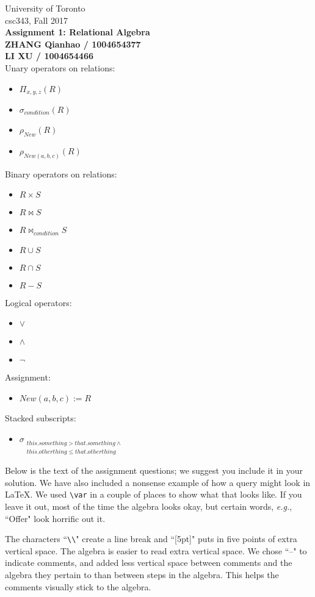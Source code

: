 \documentclass{article}
\newcommand{\var}[1]{\mathit{#1}}
\begin{document}
\noindent
University of Toronto\\
{\sc csc}343, Fall 2017\\[10pt]
{\LARGE\bf Assignment 1: Relational Algebra \\
ZHANG Qianhao / 1004654377 \\
LI XU / 1004654466
} \\[10pt]

\noindent
Unary operators on relations:
\begin{itemize}
\item $\Pi_{x, y, z} (R)$
\item $\sigma_{condition} (R) $
\item $\rho_{New} (R) $
\item $\rho_{New(a, b, c)} (R) $
\end{itemize}
Binary operators on relations:
\begin{itemize}
\item $R \times S$
\item $R \bowtie S$
\item $R \bowtie_{condition} S$
\item $R \cup S$
\item $R \cap S$
\item $R - S$
\end{itemize}
Logical operators:
\begin{itemize}
\item $\vee$
\item $\wedge$
\item $\neg$
\end{itemize}
Assignment:
\begin{itemize}
\item $New(a, b, c) := R$
\end{itemize}
Stacked subscripts:
\begin{itemize}
\item
$\sigma_{\substack{this.something > that.something \wedge \\ this.otherthing \leq that.otherthing}}$
\end{itemize}

\noindent
Below is the text of the assignment questions; we suggest you include it in your solution.
We have also included a nonsense example of how a query might look in LaTeX.  
We used \verb|\var| in a couple of places to show what that looks like.  
If you leave it out, most of the time the algebra looks okay, but certain words,
{\it e.g.}, ``Offer" look horrific out it.

The characters ``\verb|\\|" create a line break and ``[5pt]" puts in 
five points of extra vertical space.  The algebra is easier to read  extra
vertical space.
We chose ``--" to indicate comments, and added less vertical space between comments
and the algebra they pertain to than between steps in the algebra.
This helps the comments visually stick to the algebra.
\end{document}
